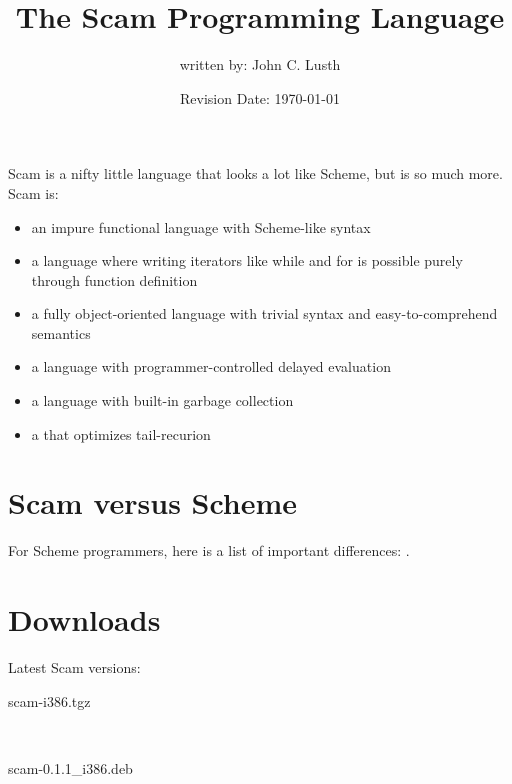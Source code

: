 \documentclass{article}
\title{The Scam Programming Language}
\author{written by: John C. Lusth}
\date{Revision Date: \today}
\begin{document}
\maketitle

\W{}

Scam is a nifty little language
that looks a lot like Scheme, but is so much more.
Scam is:

\begin{itemize}
    \item
        an impure functional language with Scheme-like syntax
    \item
        a language where writing iterators like while and for
        is possible purely through function definition
    \item
        a fully object-oriented language with trivial syntax and
        easy-to-comprehend semantics
    \item
        a language with programmer-controlled delayed
        evaluation
    \item
        a language with built-in garbage collection
    \item
        a that optimizes tail-recurion
\end{itemize}

\section*{Scam versus Scheme}

For Scheme programmers, here is a list of important
differences: .

\section*{Downloads}

Latest Scam versions:

\begin{description}
    \item
         {scam-i386.tgz}
    \item
    \item
    \item
        ~
    \item
         {scam-0.1.1\_i386.deb}
    \item
\end{description}
\end{document}
